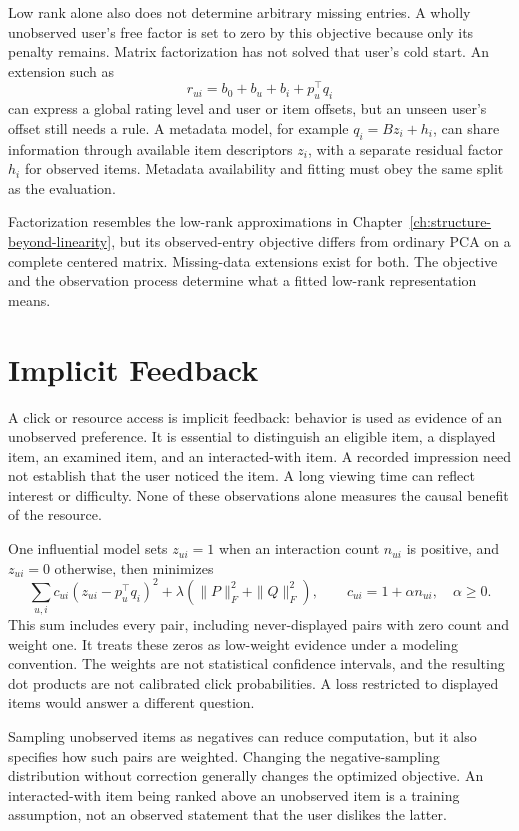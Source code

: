 Low rank alone also does not determine arbitrary missing entries. A wholly unobserved user's free factor is set to zero by this objective because only its penalty remains. Matrix factorization has not solved that user's cold start. An extension such as
\[
\widehat r_{ui}=b_0+b_u+b_i+p_u^\top q_i
\]
can express a global rating level and user or item offsets, but an unseen user's offset still needs a rule. A metadata model, for example $q_i=Bz_i+h_i$, can share information through available item descriptors $z_i$, with a separate residual factor $h_i$ for observed items. Metadata availability and fitting must obey the same split as the evaluation.

Factorization resembles the low-rank approximations in Chapter~\ref{ch:structure-beyond-linearity}, but its observed-entry objective differs from ordinary PCA on a complete centered matrix. Missing-data extensions exist for both. The objective and the observation process determine what a fitted low-rank representation means.

\section{Implicit Feedback}
\label{sec:implicit-feedback}

A click or resource access is implicit feedback: behavior is used as evidence of an unobserved preference. It is essential to distinguish an eligible item, a displayed item, an examined item, and an interacted-with item. A recorded impression need not establish that the user noticed the item. A long viewing time can reflect interest or difficulty. None of these observations alone measures the causal benefit of the resource.

One influential model sets $z_{ui}=1$ when an interaction count $n_{ui}$ is positive, and $z_{ui}=0$ otherwise, then minimizes \citep{hu2008implicit}
\[
\sum_{u,i}c_{ui}(z_{ui}-p_u^\top q_i)^2
+\lambda(\|P\|_F^2+\|Q\|_F^2),
\qquad c_{ui}=1+\alpha n_{ui},\quad \alpha\ge0.
\]
This sum includes every pair, including never-displayed pairs with zero count and weight one. It treats these zeros as low-weight evidence under a modeling convention. The weights are not statistical confidence intervals, and the resulting dot products are not calibrated click probabilities. A loss restricted to displayed items would answer a different question.

Sampling unobserved items as negatives can reduce computation, but it also specifies how such pairs are weighted. Changing the negative-sampling distribution without correction generally changes the optimized objective. An interacted-with item being ranked above an unobserved item is a training assumption, not an observed statement that the user dislikes the latter.

